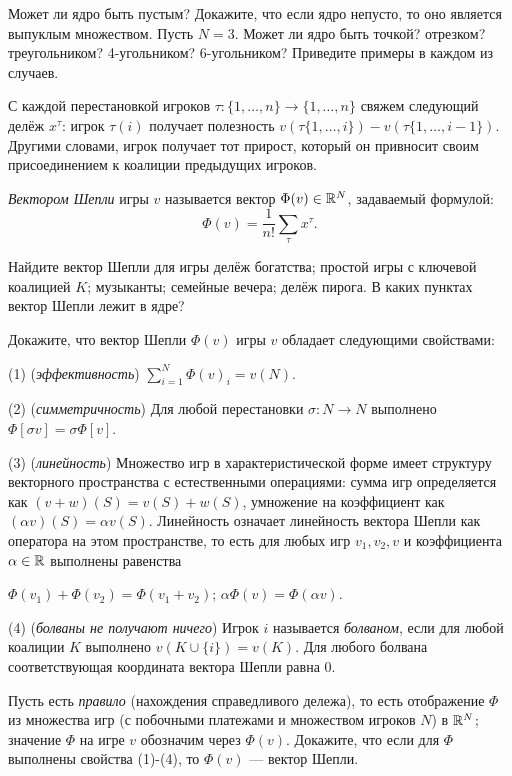 \documentclass[a4paper,12pt]{article}
\begin{document}
  Может ли ядро быть пустым?
 Докажите, что если ядро непусто, то оно является выпуклым множеством.
 Пусть $N=3$. Может ли ядро быть точкой? отрезком? треугольником? 4-угольником? 6-угольником? Приведите примеры в каждом из случаев.

\newpage
{}

С каждой перестановкой игроков $\tau: \{1,\dots,n\} \to  \{1,\dots,n\}$ свяжем следующий делёж $x^{\tau}$: игрок $\tau(i)$ получает полезность $v(\tau\{1,\dots,i\})-v(\tau\{1,\dots,i-1\})$. Другими словами, игрок получает тот прирост, который он привносит своим присоединением к коалиции предыдущих игроков.

\textit{Вектором Шепли} игры $v$ называется вектор $\Phi(v) \in \mathbb{R}^N$, задаваемый формулой: $$\Phi(v) = \frac{1}{n!} \sum_{\tau} x^{\tau}.$$

\label{Shapl:examp} Найдите вектор Шепли для игры  делёж богатства;  простой игры с ключевой коалицией $K$;  музыканты;  семейные вечера;  делёж  пирога.  В каких пунктах вектор Шепли лежит в ядре?


 Докажите, что вектор Шепли $\Phi(v)$ игры $v$ обладает следующими свойствами:

(1) ({\it эффективность}) $\sum_{i=1}^N \Phi(v)_i = v(N)$.

(2) ({\it симметричность}) Для любой перестановки $\sigma : N \to N$ выполнено $\Phi[\sigma v] = \sigma \Phi[v]$.

(3) ({\it линейность})   Множество игр в характеристической форме имеет структуру векторного пространства с естественными операциями: сумма игр определяется как  $(v+w)(S) = v(S)+w(S)$, умножение на коэффициент как $(\alpha v)(S) = \alpha v(S)$.  Линейность означает линейность вектора Шепли как оператора на этом пространстве, то есть для любых игр $v_1,v_2,v$ и коэффициента $\alpha \in \mathbb{R}$ выполнены равенства

$\Phi(v_1) + \Phi(v_2) = \Phi(v_1+v_2)$; $\alpha \Phi(v) = \Phi(\alpha v)$.

(4) ({\it болваны не получают ничего}) Игрок $i$ называется \textit{болваном}, если для любой коалиции $K$ выполнено $v(K \cup \{i\}) = v(K)$. Для любого болвана соответствующая координата вектора Шепли равна $0$.

 Пусть есть \textit{правило} (нахождения справедливого дележа), то есть отображение $\Phi$ из множества игр (с побочными платежами и множеством игроков $N$) в $\mathbb{R}^N$; значение $\Phi$ на игре $v$ обозначим через $\Phi(v)$.
Докажите, что если для $\Phi$ выполнены свойства (1)-(4), то $\Phi(v)$ --- вектор Шепли.
\end{document}
